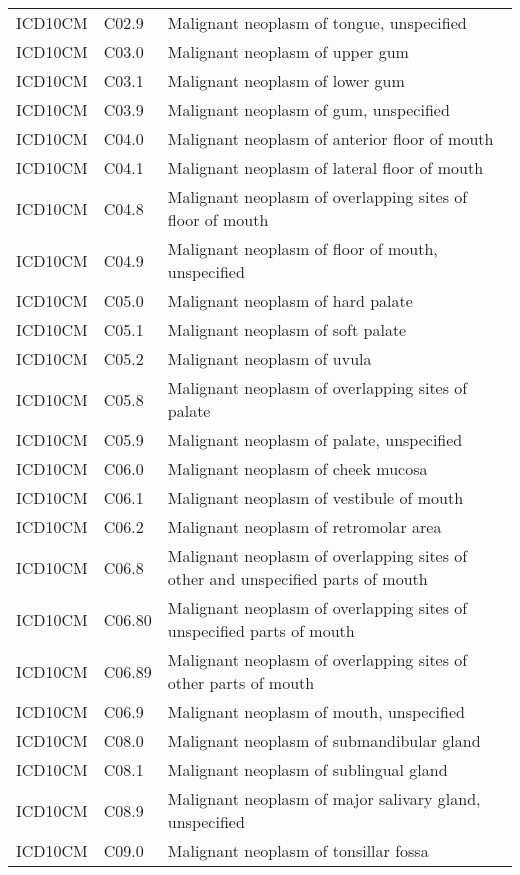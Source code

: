 \begin{longtable}{p{}p{}p{}}
  ICD10CM & C02.9 & Malignant neoplasm of tongue, unspecified \\ 
  ICD10CM & C03.0 & Malignant neoplasm of upper gum \\ 
  ICD10CM & C03.1 & Malignant neoplasm of lower gum \\ 
  ICD10CM & C03.9 & Malignant neoplasm of gum, unspecified \\ 
  ICD10CM & C04.0 & Malignant neoplasm of anterior floor of mouth \\ 
  ICD10CM & C04.1 & Malignant neoplasm of lateral floor of mouth \\ 
  ICD10CM & C04.8 & Malignant neoplasm of overlapping sites of floor of mouth \\ 
  ICD10CM & C04.9 & Malignant neoplasm of floor of mouth, unspecified \\ 
  ICD10CM & C05.0 & Malignant neoplasm of hard palate \\ 
  ICD10CM & C05.1 & Malignant neoplasm of soft palate \\ 
  ICD10CM & C05.2 & Malignant neoplasm of uvula \\ 
  ICD10CM & C05.8 & Malignant neoplasm of overlapping sites of palate \\ 
  ICD10CM & C05.9 & Malignant neoplasm of palate, unspecified \\ 
  ICD10CM & C06.0 & Malignant neoplasm of cheek mucosa \\ 
  ICD10CM & C06.1 & Malignant neoplasm of vestibule of mouth \\ 
  ICD10CM & C06.2 & Malignant neoplasm of retromolar area \\ 
  ICD10CM & C06.8 & Malignant neoplasm of overlapping sites of other and unspecified parts of mouth \\ 
  ICD10CM & C06.80 & Malignant neoplasm of overlapping sites of unspecified parts of mouth \\ 
  ICD10CM & C06.89 & Malignant neoplasm of overlapping sites of other parts of mouth \\ 
  ICD10CM & C06.9 & Malignant neoplasm of mouth, unspecified \\ 
  ICD10CM & C08.0 & Malignant neoplasm of submandibular gland \\ 
  ICD10CM & C08.1 & Malignant neoplasm of sublingual gland \\ 
  ICD10CM & C08.9 & Malignant neoplasm of major salivary gland, unspecified \\ 
  ICD10CM & C09.0 & Malignant neoplasm of tonsillar fossa \\ 

\end{longtable}
